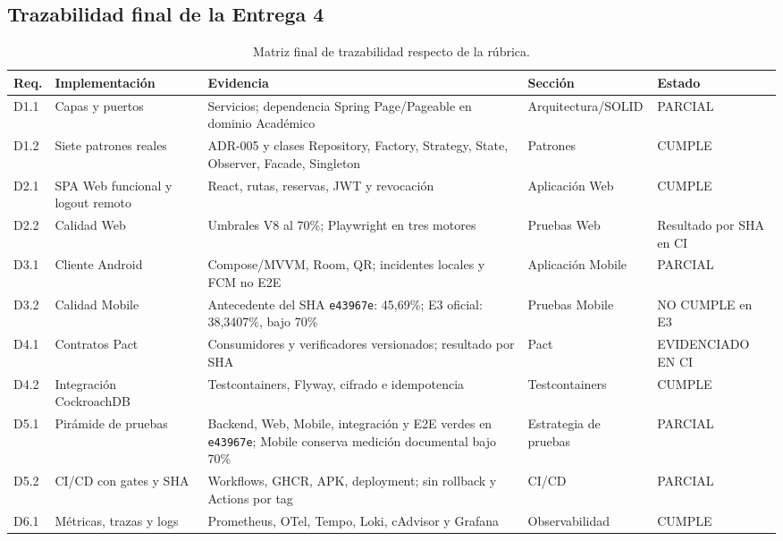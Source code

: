 \subsection{Trazabilidad final de la Entrega 4}
\label{subsec:trazabilidad-final}

\begin{table}[ht]
  \centering
  \scriptsize
  \caption{Matriz final de trazabilidad respecto de la rúbrica.}
  \label{tab:trazabilidad-final}
  \begin{tabular}{|p{1.1cm}|p{3.0cm}|p{4.1cm}|p{2.2cm}|p{1.7cm}|}
    \hline
    \textbf{Req.} & \textbf{Implementación} & \textbf{Evidencia} & \textbf{Sección} & \textbf{Estado} \\
    \hline
    D1.1 & Capas y puertos & Servicios; dependencia Spring Page/Pageable en dominio Académico & Arquitectura/SOLID & PARCIAL \\
    \hline
    D1.2 & Siete patrones reales & ADR-005 y clases Repository, Factory, Strategy, State, Observer, Facade, Singleton & Patrones & CUMPLE \\
    \hline
    D2.1 & SPA Web funcional y logout remoto & React, rutas, reservas, JWT y revocación & Aplicación Web & CUMPLE \\
    \hline
    D2.2 & Calidad Web & Umbrales V8 al 70\%; Playwright en tres motores & Pruebas Web & Resultado por SHA en CI \\
    \hline
    D3.1 & Cliente Android & Compose/MVVM, Room, QR; incidentes locales y FCM no E2E & Aplicación Mobile & PARCIAL \\
    \hline
    D3.2 & Calidad Mobile & Antecedente del SHA \texttt{e43967e}: 45,69\%; E3 oficial: 38,3407\%, bajo 70\% & Pruebas Mobile & NO CUMPLE en E3 \\
    \hline
    D4.1 & Contratos Pact & Consumidores y verificadores versionados; resultado por SHA & Pact & EVIDENCIADO EN CI \\
    \hline
    D4.2 & Integración CockroachDB & Testcontainers, Flyway, cifrado e idempotencia & Testcontainers & CUMPLE \\
    \hline
    D5.1 & Pirámide de pruebas & Backend, Web, Mobile, integración y E2E verdes en \texttt{e43967e}; Mobile conserva medición documental bajo 70\% & Estrategia de pruebas & PARCIAL \\
    \hline
    D5.2 & CI/CD con gates y SHA & Workflows, GHCR, APK, deployment; sin rollback y Actions por tag & CI/CD & PARCIAL \\
    \hline
    D6.1 & Métricas, trazas y logs & Prometheus, OTel, Tempo, Loki, cAdvisor y Grafana & Observabilidad & CUMPLE \\

\end{tabular}
\end{table}
